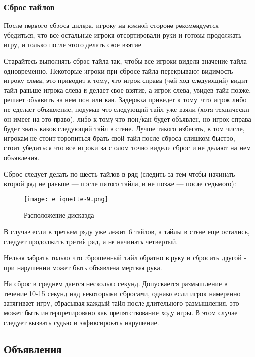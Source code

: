 \subsubsection{Сброс тайлов}

После первого сброса дилера, игроку на южной стороне рекомендуется убедиться, что все остальные игроки отсортировали руки и готовы продолжать игру, и только после этого делать свое взятие.

Старайтесь выполнять сброс тайла так, чтобы все игроки видели значение тайла одновременно. Некоторые игроки при сбросе тайла перекрывают видимость игроку слева, это приводит к тому, что игрок справа (чей ход следующий) видит тайл раньше игрока слева и делает свое взятие, а игрок слева, увидев тайл позже, решает объявить на нем пон или кан. Задержка приведет к тому, что игрок либо не сделает объявление, подумав что следующий тайл уже взяли (хотя технически он имеет на это право), либо к тому что пон/кан будет объявлен, но игрок справа будет знать каков следующий тайл в стене. Лучше такого избегать, в том числе, игрокам не стоит торопиться брать свой тайл после сброса слишком быстро, стоит убедиться что все игроки за столом точно видели сброс и не делают на нем объявления.

Сброс следует делать по шесть тайлов в ряд (следить за тем чтобы начинать второй ряд не раньше --- после пятого тайла, и не позже --- после седьмого):

\begin{figure}[H]
	\centering
	\texttt{[image: etiquette-9.png]}
	\caption{Расположение дискарда}
\end{figure}

В случае если в третьем ряду уже лежит 6 тайлов, а тайлы в стене еще остались, следует продолжить третий ряд, а не начинать четвертый.

Нельзя забрать только что сброшенный тайл обратно в руку и сбросить другой - при нарушении может быть объявлена мертвая рука.

На сброс в среднем дается несколько секунд. Допускается размышление в течение 10-15 секунд над некоторыми сбросами, однако если игрок намеренно затягивает игру, сбрасывая каждый тайл после длительного размышления, это может быть интерпретировано как препятствование ходу игры. В этом случае следует вызвать судью и зафиксировать нарушение.

\subsection{Объявления}

